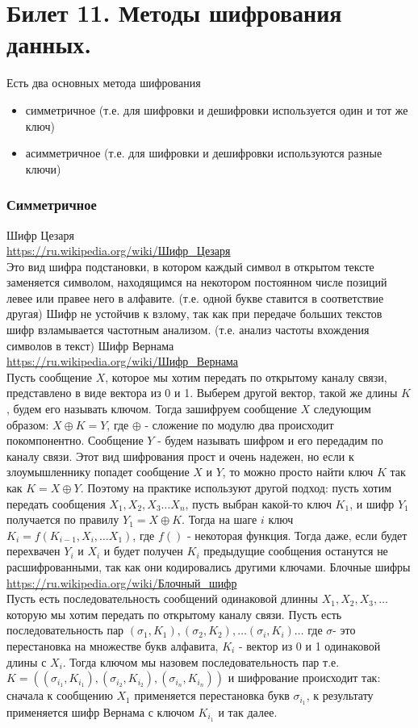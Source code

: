 \newpage
\section {Билет 11. Методы шифрования данных.}

Есть два основных метода шифрования 
\begin {itemize}
\item симметричное (т.е. для шифровки и дешифровки используется один и тот же ключ)
\item асимметричное (т.е. для шифровки и дешифровки используются разные ключи)
\end {itemize}

\subsubsection{Симметричное}
Шифр Цезаря\\
\url{https://ru.wikipedia.org/wiki/Шифр_Цезаря} \\
Это вид шифра подстановки, в котором каждый символ в открытом тексте заменяется символом, находящимся на некотором постоянном числе позиций левее или правее него в алфавите. (т.е. одной букве ставится в соответствие другая) Шифр не устойчив к взлому, так как при передаче больших текстов шифр взламывается частотным анализом. (т.е. анализ частоты вхождения символов в текст) 
Шифр Вернама \\
\url{https://ru.wikipedia.org/wiki/Шифр_Вернама} \\
Пусть сообщение $X$, которое мы хотим передать по открытому каналу связи, представлено в виде вектора из 0 и 1. Выберем другой вектор, такой же длины $K$, будем его называть ключом. Тогда зашифруем сообщение $X$ следующим образом: $X \oplus K = Y$, где $\oplus$ - сложение по модулю два происходит покомпонентно. Сообщение $Y$ - будем называть шифром и его передадим по каналу связи. Этот вид шифрования прост и очень надежен, но если к злоумышленнику попадет сообщение $X$ и $Y$, то можно просто найти ключ $K$ так как $K = X \oplus Y$. Поэтому на практике используют другой подход: пусть хотим передать сообщения $X_1, X_2, X_3 \dots X_n$, пусть выбран какой-то ключ $K_1$, и шифр $Y_1$ получается по правилу $Y_1 = X \oplus K$. Тогда на шаге $i$ ключ $K_i = f (K_{i - 1}, X_i, \dots X_1)$, где $f()$ - некоторая функция. Тогда даже, если будет перехвачен $Y_i$ и $X_i$ и будет получен $K_i$ предыдущие сообщения останутся не расшифрованными, так как они кодировались другими ключами. 
Блочные шифры \\
\url{https://ru.wikipedia.org/wiki/Блочный_шифр} \\
Пусть есть последовательность сообщений одинаковой длинны $X_1, X_2, X_3, \dots$ которую мы хотим передать по открытому каналу связи. Пусть есть последовательность пар $(\sigma_1, K_1), (\sigma_2, K_2), \dots (\sigma_i, K_i) \dots$ где $\sigma$- это перестановка на множестве букв алфавита, $K_i$ - вектор из 0 и 1 одинаковой длины с $X_i$. Тогда ключом мы назовем последовательность пар т.е. $K = ((\sigma_{i_1}, K_{i_1}), (\sigma_{i_2}, K_{i_2}), (\sigma_{i_n}, K_{i_n}))$ и шифрование происходит так: сначала к сообщению $X_1$ применяется перестановка букв $\sigma_{i_1}$, к результату применяется шифр Вернама с ключом $K_{i_1}$ и так далее.

